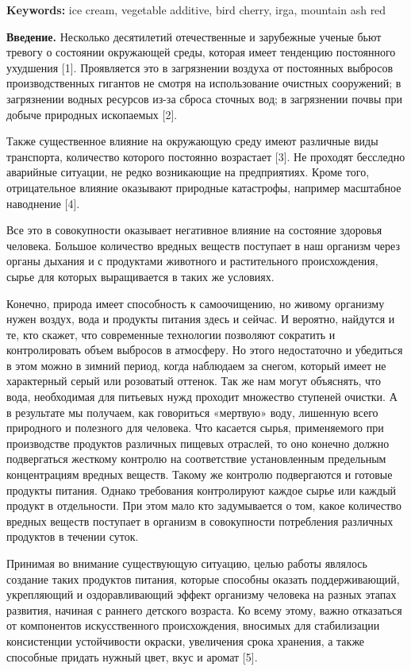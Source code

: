 {{{\bfseries Keywords:} ice cream, vegetable additive, bird cherry, irga,
mountain ash red

{\bfseries Введение.} Несколько десятилетий отечественные и зарубежные
ученые бьют тревогу о состоянии окружающей среды, которая имеет
тенденцию постоянного ухудшения {[}1{]}. Проявляется это в загрязнении
воздуха от постоянных выбросов производственных гигантов не смотря на
использование очистных сооружений; в загрязнении водных ресурсов из-за
сброса сточных вод; в загрязнении почвы при добыче природных ископаемых
{[}2{]}.

Также существенное влияние на окружающую среду имеют различные виды
транспорта, количество которого постоянно возрастает {[}3{]}. Не
проходят бесследно аварийные ситуации, не редко возникающие на
предприятиях. Кроме того, отрицательное влияние оказывают природные
катастрофы, например масштабное наводнение {[}4{]}.

Все это в совокупности оказывает негативное влияние на состояние
здоровья человека. Большое количество вредных веществ поступает в наш
организм через органы дыхания и с продуктами животного и растительного
происхождения, сырье для которых выращивается в таких же условиях.

Конечно, природа имеет способность к самоочищению, но живому организму
нужен воздух, вода и продукты питания здесь и сейчас. И вероятно,
найдутся и те, кто скажет, что современные технологии позволяют
сократить и контролировать объем выбросов в атмосферу. Но этого
недостаточно и убедиться в этом можно в зимний период, когда наблюдаем
за снегом, который имеет не характерный серый или розоватый оттенок. Так
же нам могут объяснять, что вода, необходимая для питьевых нужд проходит
множество ступеней очистки. А в результате мы получаем, как говориться
«мертвую» воду, лишенную всего природного и полезного для человека. Что
касается сырья, применяемого при производстве продуктов различных
пищевых отраслей, то оно конечно должно подвергаться жесткому контролю
на соответствие установленным предельным концентрациям вредных веществ.
Такому же контролю подвергаются и готовые продукты питания. Однако
требования контролируют каждое сырье или каждый продукт в отдельности.
При этом мало кто задумывается о том, какое количество вредных веществ
поступает в организм в совокупности потребления различных продуктов в
течении суток.

Принимая во внимание существующую ситуацию, целью работы являлось
создание таких продуктов питания, которые способны оказать
поддерживающий, укрепляющий и оздоравливающий эффект организму человека
на разных этапах развития, начиная с раннего детского возраста. Ко всему
этому, важно отказаться от компонентов искусственного происхождения,
вносимых для стабилизации консистенции устойчивости окраски, увеличения
срока хранения, а также способные придать нужный цвет, вкус и аромат
{[}5{]}.

}}

